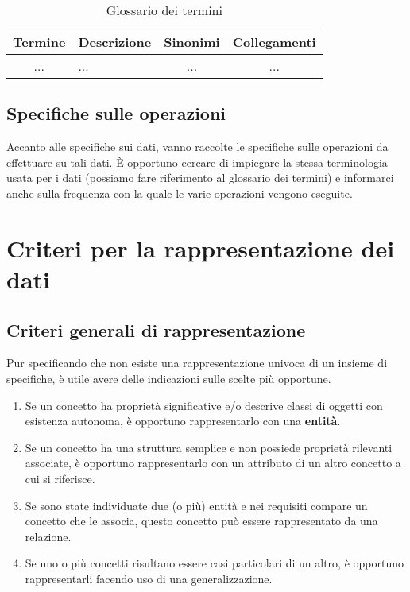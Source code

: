     \begin{table}[h!]
        \begin{tabularx}{\textwidth}{|c|X|c|c|} \hline
            \textbf{Termine} & \textbf{Descrizione} & \textbf{Sinonimi} & \textbf{Collegamenti} \\ \hline
            ... & ... & ... & ... \\ \hline
        \end{tabularx}
        \caption{Glossario dei termini}
    \end{table}

\subsection{Specifiche sulle operazioni}
Accanto alle specifiche sui dati, vanno raccolte le specifiche sulle operazioni da effettuare su tali dati.
È opportuno cercare di impiegare la stessa terminologia usata per i dati (possiamo fare riferimento al glossario dei termini) e informarci anche sulla frequenza con la quale le varie operazioni vengono eseguite.



\section{Criteri per la rappresentazione dei dati}

\subsection{Criteri generali di rappresentazione}
Pur specificando che non esiste una rappresentazione univoca di un insieme di specifiche, è utile avere delle indicazioni sulle scelte più opportune.
    \begin{enumerate}
        \item{Se un concetto ha proprietà significative e/o descrive classi di oggetti con esistenza autonoma, è opportuno rappresentarlo con una \textbf{entità}.}
        \item{Se un concetto ha una struttura semplice e non possiede proprietà rilevanti associate, è opportuno rappresentarlo con un attributo di un altro concetto a cui si riferisce.}
        \item{Se sono state individuate due (o più) entità e nei requisiti compare un concetto che le associa, questo concetto può essere rappresentato da una relazione.}
        \item{Se uno o più concetti risultano essere casi particolari di un altro, è opportuno rappresentarli facendo uso di una generalizzazione.}
    \end{enumerate}

